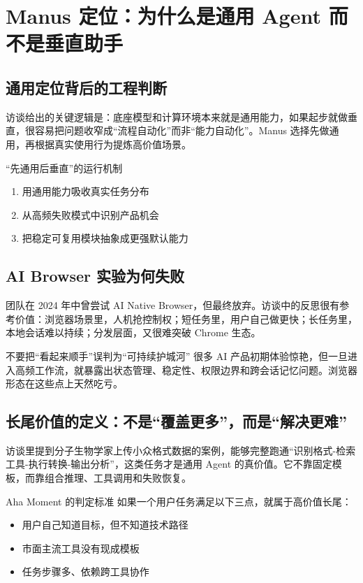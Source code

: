 \section{Manus 定位：为什么是通用 Agent 而不是垂直助手}

\subsection{通用定位背后的工程判断}

访谈给出的关键逻辑是：底座模型和计算环境本来就是通用能力，如果起步就做垂直，很容易把问题收窄成“流程自动化”而非“能力自动化”。Manus 选择先做通用，再根据真实使用行为提炼高价值场景。

\begin{knowledgebox}{“先通用后垂直”的运行机制}
\begin{enumerate}
    \item 用通用能力吸收真实任务分布
    \item 从高频失败模式中识别产品机会
    \item 把稳定可复用模块抽象成更强默认能力
\end{enumerate}
\end{knowledgebox}

\subsection{AI Browser 实验为何失败}

团队在 2024 年中曾尝试 AI Native Browser，但最终放弃。访谈中的反思很有参考价值：浏览器场景里，人机抢控制权；短任务里，用户自己做更快；长任务里，本地会话难以持续；分发层面，又很难突破 Chrome 生态。

\begin{warningbox}{不要把“看起来顺手”误判为“可持续护城河”}
很多 AI 产品初期体验惊艳，但一旦进入高频工作流，就暴露出状态管理、稳定性、权限边界和跨会话记忆问题。浏览器形态在这些点上天然吃亏。
\end{warningbox}

\subsection{长尾价值的定义：不是“覆盖更多”，而是“解决更难”}

访谈里提到分子生物学家上传小众格式数据的案例，能够完整跑通“识别格式-检索工具-执行转换-输出分析”，这类任务才是通用 Agent 的真价值。它不靠固定模板，而靠组合推理、工具调用和失败恢复。

\begin{importantbox}{Aha Moment 的判定标准}
如果一个用户任务满足以下三点，就属于高价值长尾：
\begin{itemize}
    \item 用户自己知道目标，但不知道技术路径
    \item 市面主流工具没有现成模板
    \item 任务步骤多、依赖跨工具协作
\end{itemize}
\end{importantbox}

